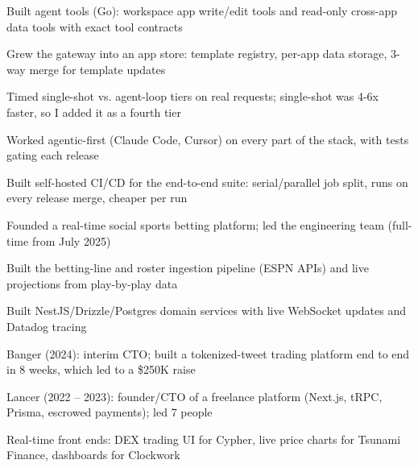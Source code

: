 \documentclass[print]{jack-resume}
\begin{document}
\begin{tightemize}
    \item Built agent tools (Go): workspace app write/edit tools and read-only cross-app data tools with exact tool contracts
    \item Grew the gateway into an app store: template registry, per-app data storage, 3-way merge for template updates
    \item Timed single-shot vs. agent-loop tiers on real requests; single-shot was 4-6x faster, so I added it as a fourth tier
    \item Worked agentic-first (Claude Code, Cursor) on every part of the stack, with tests gating each release
    \item Built self-hosted CI/CD for the end-to-end suite: serial/parallel job split, runs on every release merge, cheaper per run
\end{tightemize}
\sectionsep

\begin{tightemize}
    \item Founded a real-time social sports betting platform; led the engineering team (full-time from July 2025)
    \item Built the betting-line and roster ingestion pipeline (ESPN APIs) and live projections from play-by-play data
    \item Built NestJS/Drizzle/Postgres domain services with live WebSocket updates and Datadog tracing
\end{tightemize}
\sectionsep

\begin{tightemize}
    \item Banger (2024): interim CTO; built a tokenized-tweet trading platform end to end in 8 weeks, which led to a \$250K raise
    \item Lancer (2022 -- 2023): founder/CTO of a freelance platform (Next.js, tRPC, Prisma, escrowed payments); led 7 people
    \item Real-time front ends: DEX trading UI for Cypher, live price charts for Tsunami Finance, dashboards for Clockwork
\end{tightemize}
\sectionsep
\end{document}

